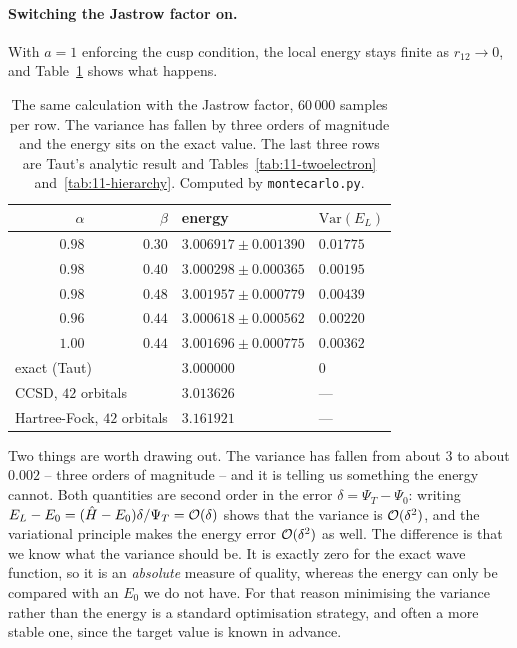 \paragraph{Switching the Jastrow factor on.}
With $a=1$ enforcing the cusp condition, the local energy stays finite as
$r_{12}\to0$, and Table~\ref{tab:12-vmcjastrow} shows what happens.

\begin{table}[h]
\centering
\renewcommand{\arraystretch}{1.25}
\setlength{\tabcolsep}{12pt}
\begin{tabular}{rrll}
\toprule
$\alpha$ & $\beta$ & energy & $\mathrm{Var}(E_L)$\\
\midrule
$0.98$ & $0.30$ & $3.006917\pm0.001390$ & $0.01775$\\
$0.98$ & $0.40$ & $3.000298\pm0.000365$ & $0.00195$\\
$0.98$ & $0.48$ & $3.001957\pm0.000779$ & $0.00439$\\
$0.96$ & $0.44$ & $3.000618\pm0.000562$ & $0.00220$\\
$1.00$ & $0.44$ & $3.001696\pm0.000775$ & $0.00362$\\
\midrule
\multicolumn{2}{l}{exact (Taut)} & $3.000000$ & $0$\\
\multicolumn{2}{l}{CCSD, $42$ orbitals} & $3.013626$ & ---\\
\multicolumn{2}{l}{Hartree-Fock, $42$ orbitals} & $3.161921$ & ---\\
\bottomrule
\end{tabular}
\caption{The same calculation with the Jastrow factor, $60\,000$ samples per
row.  The variance has fallen by three orders of magnitude and the energy sits
on the exact value.  The last three rows are Taut's analytic result and
Tables~\ref{tab:11-twoelectron} and~\ref{tab:11-hierarchy}.  Computed by
\texttt{montecarlo.py}.}
\label{tab:12-vmcjastrow}
\end{table}

Two things are worth drawing out.  The variance has fallen from about $3$ to
about $0.002$ -- three orders of magnitude -- and it is telling us something
the energy cannot.  Both quantities are second order in the error
$\delta=\Psi_T-\Psi_0$: writing
$E_L-E_0=(\hat{H}-E_0)\delta/\Psi_T=\mathcal{O}(\delta)$ shows that the variance is
$\mathcal{O}(\delta^2)$, and the variational principle makes the energy error
$\mathcal{O}(\delta^2)$ as well.  The difference is that we know what the variance
should be.  It is exactly zero for the exact wave function, so it is an
\emph{absolute} measure of quality, whereas the energy can only be compared
with an $E_0$ we do not have.  For that reason minimising the variance rather
than the energy is a standard optimisation strategy, and often a more stable
one, since the target value is known in advance.

